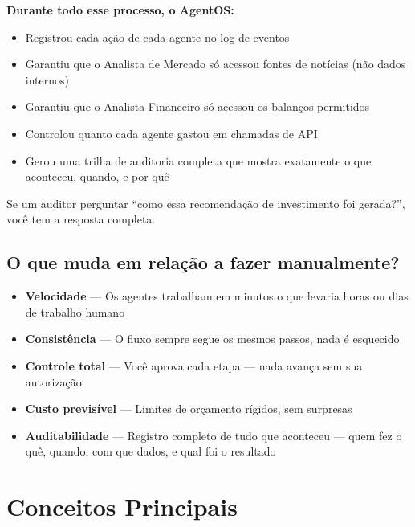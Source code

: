 \documentclass[12pt, a4paper]{article}
\begin{document}
\textbf{Durante todo esse processo, o AgentOS:}
\begin{itemize}[leftmargin=1.5em]
    \item Registrou cada ação de cada agente no log de eventos
    \item Garantiu que o Analista de Mercado só acessou fontes de notícias (não dados internos)
    \item Garantiu que o Analista Financeiro só acessou os balanços permitidos
    \item Controlou quanto cada agente gastou em chamadas de API
    \item Gerou uma trilha de auditoria completa que mostra exatamente o que aconteceu, quando, e por quê
\end{itemize}

Se um auditor perguntar ``como essa recomendação de investimento foi gerada?'', você tem a resposta completa.

\subsection{O que muda em relação a fazer manualmente?}

\begin{itemize}[leftmargin=1.5em]
    \item \textbf{Velocidade} --- Os agentes trabalham em minutos o que levaria horas ou dias de trabalho humano
    \item \textbf{Consistência} --- O fluxo sempre segue os mesmos passos, nada é esquecido
    \item \textbf{Controle total} --- Você aprova cada etapa --- nada avança sem sua autorização
    \item \textbf{Custo previsível} --- Limites de orçamento rígidos, sem surpresas
    \item \textbf{Auditabilidade} --- Registro completo de tudo que aconteceu --- quem fez o quê, quando, com que dados, e qual foi o resultado
\end{itemize}

\section{Conceitos Principais}
\end{document}
